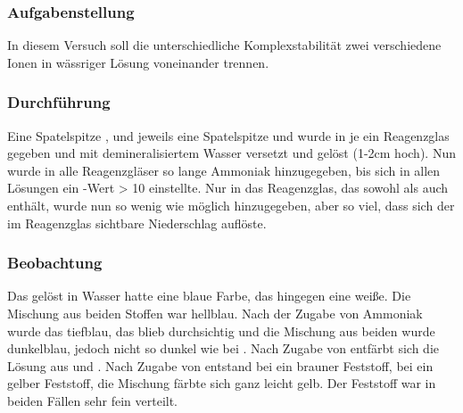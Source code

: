 \documentclass{scrartcl}
\begin{document}
\subsubsection{Aufgabenstellung}
In diesem Versuch soll die unterschiedliche Komplexstabilität zwei verschiedene Ionen in wässriger Lösung voneinander trennen.
\subsubsection{Durchführung}
Eine Spatelspitze ,  und jeweils eine Spatelspitze  und  wurde in je ein Reagenzglas gegeben und mit demineralisiertem Wasser versetzt und gelöst (1-2cm hoch). Nun wurde in alle Reagenzgläser so lange Ammoniak hinzugegeben, bis sich in allen Lösungen ein \pH-Wert > 10 einstellte. Nur in das Reagenzglas, das sowohl  als auch  enthält, wurde nun so wenig   wie möglich hinzugegeben, aber so viel, dass sich der im Reagenzglas sichtbare Niederschlag auflöste.
\subsubsection{Beobachtung}
Das  gelöst in Wasser hatte eine blaue Farbe, das  hingegen eine weiße. Die Mischung aus beiden Stoffen war hellblau. Nach der Zugabe von Ammoniak wurde das  tiefblau, das  blieb durchsichtig und die Mischung aus beiden wurde dunkelblau, jedoch nicht so dunkel wie bei . Nach Zugabe von  entfärbt sich die Lösung aus  und . Nach Zugabe von  entstand bei  ein brauner Feststoff, bei  ein gelber Feststoff, die Mischung färbte sich ganz leicht gelb. Der Feststoff war in beiden Fällen sehr fein verteilt.
\end{document}
